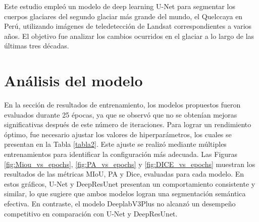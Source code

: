 \begin{comment}
Si bien es cierto en este estudio U-Net alcanzo una presición alta en comparación con \parencite{rajat2022glacier} se podria deber a la cantidad de datos de entrenamiento, en este estudio se utilizo 2,400 imagenes y de estas el 70\% de datos son para entrenmiento ademas se utilizo data augmentation en el código de entrenamiento, la perdida es mucho menor para \parencite{rajat2022glacier} que paara este estudio, esto puede deberse a las 25 épocas de entrenamiento para este entrenamiento en comparación a las 200 epocas de entrenamiento de \parencite{rajat2022glacier}

En la Figura \ref{fig:Loss_vs_epochs} se muestran los resultados del comportamiento de la función de pérdida para cada modelo utilizando los datos de evaluación. Se observa que la función de pérdida converge de manera más efectiva en los modelos U-Net y DeepResUnet, mientras que en el caso de DeepLabV3Plus, esta función de pérdida permanece elevada en comparación con U-Net y DeepResUnet.

Basado en la integración de las bandas 2, 3, 4, 5, 6 y 7 para Landsat 8 y las bandas 1,2,3,4,5,7 para landsat 5 Collection 2 Level-1, U-Net demostró ser el modelo con el mejor rendimiento, mostrando una gran precisión en la clasificación y segmentación de los límites de una amplia variedad de glaciares.

No obstante, ResUnet tambien presenta un comportamiento muy similar a U-Net. Sin embargo; este modelo presenta el mayor número de parámetros de entrenamiento en comparación con U-Net y DeepLabV3+, lo que se atribuye al mecanismo residual, que, aunque mejora el rendimiento, incrementa el costo computacional.
\end{comment}

Este estudio empleó un modelo de deep learning U-Net para segmentar los cuerpos glaciares del segundo glaciar más grande del mundo, el Quelccaya en Perú, utilizando imágenes de teledetección de Landsat correspondientes a varios años. El objetivo fue analizar los cambios ocurridos en el glaciar a lo largo de las últimas tres décadas.
\section{Análisis del modelo}
En la sección de resultados de entrenamiento, los modelos propuestos fueron evaluados durante 25 épocas, ya que se observó que no se obtenían mejoras significativas después de este número de iteraciones. Para lograr un rendimiento óptimo, fue necesario ajustar los valores de hiperparámetros, los cuales se presentan en la Tabla \ref{tabla2}. Este ajuste se realizó mediante múltiples entrenamientos para identificar la configuración más adecuada. Las Figuras \ref{fig:Miou_vs_epochs}, \ref{fig:PA_vs_epochs} y \ref{fig:DICE_vs_epochs} muestran los resultados de las métricas MIoU, PA y Dice, evaluadas para cada modelo. En estos gráficos, U-Net y DeepResUnet presentan un comportamiento consistente y similar, lo que sugiere que ambos modelos logran una segmentación semántica efectiva. En contraste, el modelo DeeplabV3Plus no alcanzó un desempeño competitivo en comparación con U-Net y DeepResUnet.

